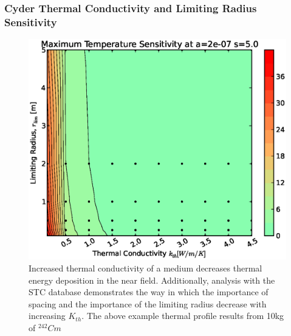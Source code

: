 \begin{frame}[ctb!]
\frametitle{Cyder Thermal Conductivity and Limiting Radius Sensitivity}


\begin{figure}[htbp!]
\begin{center}
\includegraphics[height=0.7\textheight]{./thermal_demonstration/conductivity/kr.eps}
\end{center}
\caption[$K_{th}$ vs. $r_{lim}$ Sensitivity in Cyder]
{
Increased thermal conductivity of a medium decreases thermal energy deposition 
in the near field. Additionally, analysis with the \Cyder STC database 
demonstrates the way in which the importance of spacing and the importance of 
the limiting radius decrease with increasing $K_{th}$.
The above example thermal profile results from 10kg of 
$^{242}Cm$}
\label{fig:kr}
\end{figure}
\end{frame}

